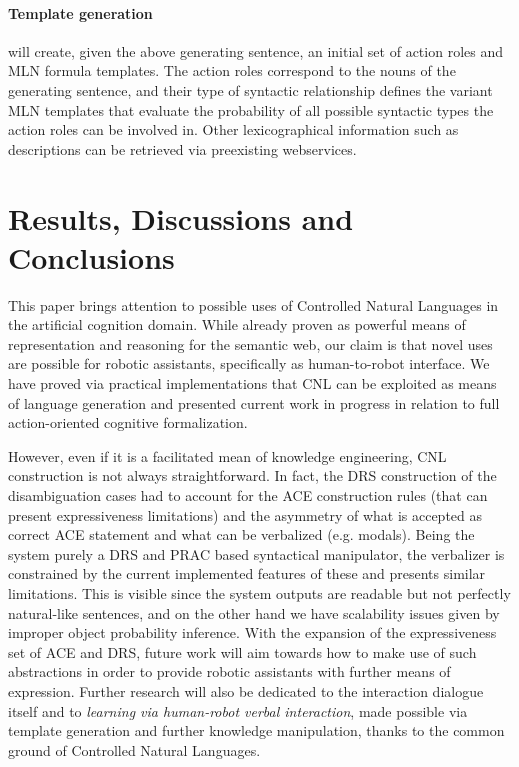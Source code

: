 \documentclass[oribibl]{llncs}
\begin{document}
\paragraph{Template generation} will create, given the above generating sentence, an initial set of action roles and MLN formula templates.  
The action roles correspond to the nouns of the generating sentence, 
and their type of syntactic relationship defines the variant MLN 
templates that evaluate the probability of all possible syntactic 
types the action roles can be involved in. Other lexicographical 
information such as descriptions can be retrieved via preexisting 
webservices.

\section{Results, Discussions and Conclusions}
This paper brings attention to possible uses of Controlled Natural Languages in the artificial cognition domain. While already proven as powerful means of representation and reasoning for the semantic web\cite{kaljurand:phd}, our claim is that novel uses are possible for robotic assistants, specifically as human-to-robot interface.
We have proved via practical implementations that CNL can be exploited as means of language generation and presented current work in progress in relation to full action-oriented cognitive formalization.

However, even if it is a facilitated mean of knowledge engineering, CNL construction is not always straightforward\cite{Schwitter05alayered}. In fact, the DRS construction of the disambiguation cases had to account for the ACE construction rules (that can present expressiveness limitations) and the asymmetry of what is accepted as correct ACE statement and what can be verbalized (e.g. modals). Being the system purely a DRS and PRAC based syntactical manipulator, the verbalizer is constrained by the current implemented features of these and presents similar limitations. This is visible since the system outputs are readable but not perfectly natural-like sentences, and on the other hand we have scalability issues given by improper object probability inference.
With the expansion of the expressiveness set of ACE and DRS, future work will aim towards how to make use of such abstractions in order to provide robotic assistants with further means of expression.
Further research will also be dedicated to the interaction dialogue itself and to \textit{learning via human-robot verbal interaction}, made possible via template generation and further knowledge manipulation, thanks to the common ground of Controlled Natural Languages.

%
{}

%
\end{document}
